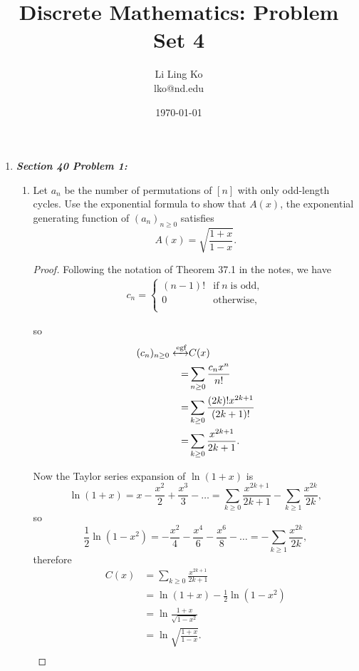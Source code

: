 \documentclass{article}
\begin{document}
\title{Discrete Mathematics: Problem Set 4}
\author{Li Ling Ko\\ lko@nd.edu}
\date{\today}
\maketitle

\begin{enumerate}[label={\bf Q\arabic*:}]
  \item \it \textbf{Section 40 Problem 1:}
    \begin{enumerate}
      \item \label{qn:odd}
        Let $a_n$ be the number of permutations of $[n]$ with only
        odd-length cycles. Use the exponential formula to show that $A(x)$,
        the exponential generating function of $(a_n)_{n\geq0}$ satisfies
        \[A(x) = \sqrt{\frac{1+x}{1-x}}.\]

        \begin{proof}
          Following the notation of Theorem 37.1 in the notes, we have
          \begin{align*}
            c_n =
            \begin{cases}
              (n-1)! &\text{if}\; n\; \text{is odd},\\
              0 &\text{otherwise},\\
            \end{cases}
          \end{align*}

          so
          \begin{align*}
            (c_n)_{n\geq0}\xleftrightarrow{\text{egf}} &C(x)\\
            =&\sum_{n\geq0} \frac{c_nx^n}{n!}\\
            =&\sum_{k\geq0} \frac{(2k)!x^{2k+1}}{(2k+1)!}\\
            =&\sum_{k\geq0} \frac{x^{2k+1}}{2k+1}.\\
          \end{align*}

          Now the Taylor series expansion of $\ln{(1+x)}$ is
          \[\ln{(1+x)} =x -\frac{x^2}{2} +\frac{x^3}{3} -\ldots
          =\sum_{k\geq0} \frac{x^{2k+1}}{2k+1} -\sum_{k\geq1}
          \frac{x^{2k}}{2k},\]
          so
          \[\frac{1}{2}\ln{(1-x^2)} =-\frac{x^2}{4} -\frac{x^4}{6}
          -\frac{x^6}{8} -\ldots =-\sum_{k\geq1} \frac{x^{2k}}{2k},\]
          therefore
          \begin{align*}
            C(x) &=\sum_{k\geq0} \frac{x^{2k+1}}{2k+1}\\
            &=\ln{(1+x)} -\frac{1}{2}\ln{(1-x^2)}\\
            &=\ln{\frac{1+x}{\sqrt{1-x^2}}}\\
            &=\ln{\sqrt{\frac{1+x}{1-x}}}.\\
          \end{align*}


\end{proof}
\end{enumerate}
\end{enumerate}
\end{document}
